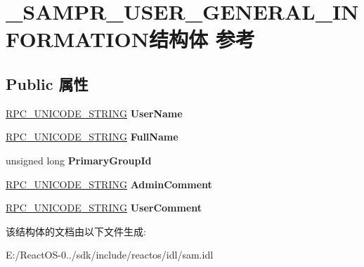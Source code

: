 \hypertarget{struct___s_a_m_p_r___u_s_e_r___g_e_n_e_r_a_l___i_n_f_o_r_m_a_t_i_o_n}{}\section{\+\_\+\+S\+A\+M\+P\+R\+\_\+\+U\+S\+E\+R\+\_\+\+G\+E\+N\+E\+R\+A\+L\+\_\+\+I\+N\+F\+O\+R\+M\+A\+T\+I\+O\+N结构体 参考}
\label{struct___s_a_m_p_r___u_s_e_r___g_e_n_e_r_a_l___i_n_f_o_r_m_a_t_i_o_n}
\subsection*{Public 属性}
\begin{DoxyCompactItemize}
\item 
\mbox{\label{struct___s_a_m_p_r___u_s_e_r___g_e_n_e_r_a_l___i_n_f_o_r_m_a_t_i_o_n_a0a5968057a31a4aa9353525924b5a71e}} 
\hyperlink{struct___r_p_c___u_n_i_c_o_d_e___s_t_r_i_n_g}{R\+P\+C\+\_\+\+U\+N\+I\+C\+O\+D\+E\+\_\+\+S\+T\+R\+I\+NG} {\bfseries User\+Name}
\item 
\mbox{\label{struct___s_a_m_p_r___u_s_e_r___g_e_n_e_r_a_l___i_n_f_o_r_m_a_t_i_o_n_aee5d23d92000563a54d6380679a1ff0e}} 
\hyperlink{struct___r_p_c___u_n_i_c_o_d_e___s_t_r_i_n_g}{R\+P\+C\+\_\+\+U\+N\+I\+C\+O\+D\+E\+\_\+\+S\+T\+R\+I\+NG} {\bfseries Full\+Name}
\item 
\mbox{\label{struct___s_a_m_p_r___u_s_e_r___g_e_n_e_r_a_l___i_n_f_o_r_m_a_t_i_o_n_a5f20f332062219fb953f0a1352f0f6fa}} 
unsigned long {\bfseries Primary\+Group\+Id}
\item 
\mbox{\label{struct___s_a_m_p_r___u_s_e_r___g_e_n_e_r_a_l___i_n_f_o_r_m_a_t_i_o_n_a323d86dd6aa0af8bee4b7b9c3d200a6a}} 
\hyperlink{struct___r_p_c___u_n_i_c_o_d_e___s_t_r_i_n_g}{R\+P\+C\+\_\+\+U\+N\+I\+C\+O\+D\+E\+\_\+\+S\+T\+R\+I\+NG} {\bfseries Admin\+Comment}
\item 
\mbox{\label{struct___s_a_m_p_r___u_s_e_r___g_e_n_e_r_a_l___i_n_f_o_r_m_a_t_i_o_n_aa28f662fdb7c9ae33296545fc5663783}} 
\hyperlink{struct___r_p_c___u_n_i_c_o_d_e___s_t_r_i_n_g}{R\+P\+C\+\_\+\+U\+N\+I\+C\+O\+D\+E\+\_\+\+S\+T\+R\+I\+NG} {\bfseries User\+Comment}
\end{DoxyCompactItemize}


该结构体的文档由以下文件生成\+:\begin{DoxyCompactItemize}
\item 
E\+:/\+React\+O\+S-\/0../sdk/include/reactos/idl/sam.\+idl\end{DoxyCompactItemize}

